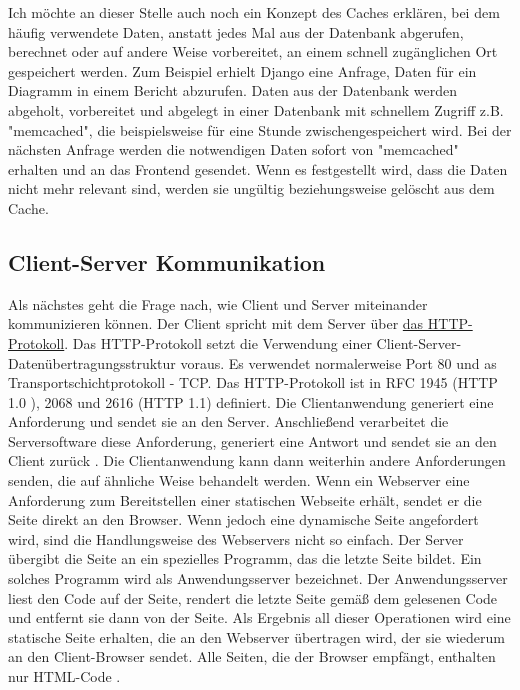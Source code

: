 Ich möchte an dieser Stelle auch noch ein Konzept des Caches erklären, bei dem häufig verwendete Daten, anstatt jedes Mal aus der Datenbank abgerufen, berechnet oder auf andere Weise vorbereitet, an einem schnell zugänglichen Ort gespeichert werden. Zum Beispiel erhielt Django eine Anfrage, Daten für ein Diagramm in einem Bericht abzurufen. Daten aus der Datenbank werden abgeholt, vorbereitet und abgelegt in einer Datenbank mit schnellem Zugriff z.B. "memcached", die beispielsweise für eine Stunde zwischengespeichert wird. Bei der nächsten Anfrage werden die notwendigen Daten sofort von "memcached" erhalten und an das Frontend gesendet. Wenn es festgestellt wird, dass die Daten nicht mehr relevant sind, werden sie ungültig beziehungsweise gelöscht aus dem Cache.

\subsection{Client-Server Kommunikation}
\label{sec:theorie:http}
Als nächstes geht die Frage nach, wie Client und Server miteinander kommunizieren können. Der Client spricht mit dem Server über \hyperref[sec:appendix:http]{das HTTP-Protokoll}. Das HTTP-Protokoll setzt die Verwendung einer Client-Server-Datenübertragungsstruktur voraus. Es verwendet normalerweise Port 80 und as Transportschichtprotokoll - TCP. Das HTTP-Protokoll ist in RFC 1945 (HTTP 1.0 \cite{website:httprfc1945}), 2068 \cite{website:httprfc2068} und 2616 (HTTP 1.1) definiert. Die Clientanwendung generiert eine Anforderung und sendet sie an den Server. Anschließend verarbeitet die Serversoftware diese Anforderung, generiert eine Antwort und sendet sie an den Client zurück \cite[pp.33-34]{shklar:webapplication}. Die Clientanwendung kann dann weiterhin andere Anforderungen senden, die auf ähnliche Weise behandelt werden. Wenn ein Webserver eine Anforderung zum Bereitstellen einer statischen Webseite erhält, sendet er die Seite direkt an den Browser.\cite{website:2} Wenn jedoch eine dynamische Seite angefordert wird, sind die Handlungsweise des Webservers nicht so einfach. Der Server übergibt die Seite an ein spezielles Programm, das die letzte Seite bildet. Ein solches Programm wird als Anwendungsserver bezeichnet. Der Anwendungsserver liest den Code auf der Seite, rendert die letzte Seite gemäß dem gelesenen Code und entfernt sie dann von der Seite. Als Ergebnis all dieser Operationen wird eine statische Seite erhalten, die an den Webserver übertragen wird, der sie wiederum an den Client-Browser sendet. Alle Seiten, die der Browser empfängt, enthalten nur HTML-Code \cite{website:2}. 
 
